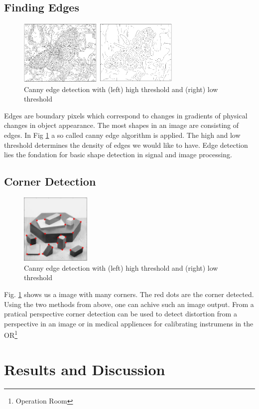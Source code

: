 \documentclass[12pt]{article}
\begin{document}
\subsection{Finding Edges}
\begin{figure}[!htb]
  \centering
  \includegraphics[width=0.7\textwidth]{pics/canny}
  \caption{Canny edge detection with (left) high threshold and (right) low threshold}
\end{figure}
Edges are boundary pixels which correspond to changes in gradients of physical changes
in object appearance. The most shapes in an image are consisting of edges. In Fig \ref{fig:canny}
a so called canny edge algorithm is applied. The high and low threshold determines the density of
edges we would like to have. Edge detection lies the fondation for basic shape detection in 
signal and image processing.

\subsection{Corner Detection}
\begin{figure}[!htb]
  \centering
  \includegraphics[width=0.3\textwidth]{pics/corner_detection}
  \caption{Canny edge detection with (left) high threshold and (right) low threshold}
  \label{fig:canny}
\end{figure}
Fig. \ref{fig:canny} shows us a image with many corners. The red dots are the corner detected.
Using the two methods from above, one can achive such an image output. From a pratical perspective
corner detection can be used to detect distortion from a perspective in an image or in medical
appliences for calibrating instrumens in the OR\footnote{Operation Room}
\pagebreak
\section{Results and Discussion}
\end{document}
